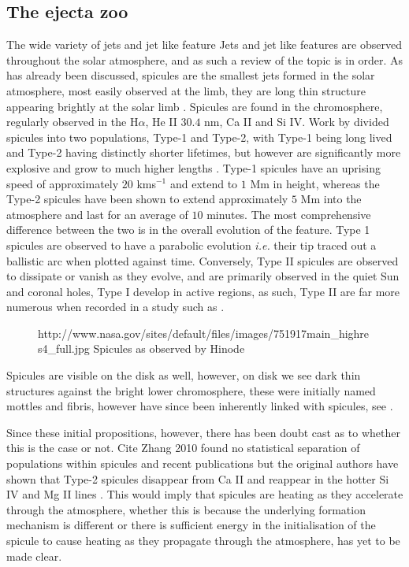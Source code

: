 \subsection{The ejecta zoo}

The wide variety of jets and jet like feature 
Jets and jet like features are observed throughout the solar atmosphere, and as such a review of the topic is in order.
As has already been discussed, spicules are the smallest jets formed in the solar atmosphere, 
most easily observed at the limb, they are long thin structure appearing brightly at the solar limb \citep{Beckers1972}.
Spicules are found in the chromosphere, regularly observed in the H$\alpha$, He II $30.4$ nm, Ca II and Si IV.
Work by \cite{DePontieu} divided spicules into two populations, Type-1 and Type-2, with Type-1 being long lived and Type-2 having distinctly shorter lifetimes, but however are significantly more explosive and grow to much higher lengths .
Type-1 spicules have an uprising speed of approximately $20$ kms$^{-1}$ and extend to $1$ Mm in height, whereas the Type-2 spicules have been shown to extend approximately $5$ Mm into the atmosphere and last for an average of $10$ minutes.
The most comprehensive difference between the two is in the overall evolution of the feature.
Type 1 spicules are observed to have a parabolic evolution \emph{i.e.} their tip traced out a ballistic arc when plotted against time.
Conversely, Type II spicules are observed to dissipate or vanish as they evolve, and are primarily observed in the quiet Sun and coronal holes, Type I develop in active regions, as such, Type II are far more numerous when recorded in a study such as \cite{Pereira2012}.

\begin{figure}
	\caption{http://www.nasa.gov/sites/default/files/images/751917main_highres4_full.jpg Spicules as observed by Hinode}
\end{figure}

Spicules are visible on the disk as well, however, on disk we see dark thin structures against the bright lower chromosphere, these were initially named mottles and fibris, however have since been inherently linked with spicules, see \cite{DePointeu2007MF}.

Since these initial propositions, however, there has been doubt cast as to whether this is the case or not. 
Cite Zhang 2010 found no statistical separation of populations within spicules and recent publications but the original authors have shown that Type-2 spicules disappear from Ca II and reappear in the hotter Si IV and Mg II lines \citep{Pereira2014}.
This would imply that spicules are heating as they accelerate through the atmosphere, whether this is because the underlying formation mechanism is different or there is sufficient energy in the initialisation of the spicule to cause heating as they propagate through the atmosphere, has yet to be made clear.

